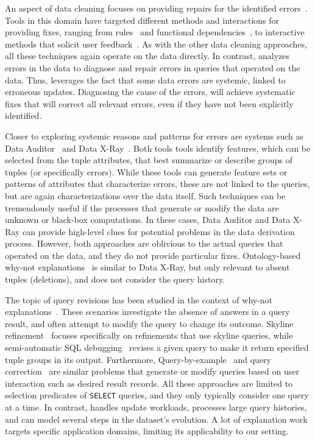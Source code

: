 An aspect of data cleaning focuses on providing repairs for the
identified errors~\cite{ChuIP13}. Tools in this domain have targeted
different methods and interactions for providing fixes, ranging from
rules~\cite{Beskales2010, Cong2007
} and functional
dependencies~\cite{Fan2008b, ChuIP13
}, to interactive methods that
solicit user feedback~\cite{Yakout, Raman01
}. As with the other data
cleaning approaches, all these techniques again operate on the data
directly. In contrast, \sys analyzes errors in the data to diagnose
and repair errors in queries that operated on the data. Thus, \sys
leverages the fact that some data errors are systemic, linked to
erroneous updates. Diagnosing the cause of the errors, will achieve
systematic fixes that will correct all relevant errors, even if they
have not been explicitly identified.

Closer to exploring systemic reasons and patterns for errors are systems such as
 Data Auditor~\cite{GolabKKS10, Golab2008
} and Data X-Ray~\cite{wang2015}. Both tools tools identify features, which can
be selected from the tuple attributes, that best summarize or describe
groups of tuples (or specifically errors). While these tools can
generate feature sets or patterns of attributes that characterize
errors, these are not linked to the queries, but are again
characterizations over the data itself. Such techniques can be
tremendously useful if the processes that generate or modify the data
are unknown or black-box computations. In these cases, Data Auditor
and Data X-Ray can provide high-level clues for potential problems in
the data derivation process. However, both approaches are oblivious to
the actual queries that operated on the data, and they do not provide
particular fixes. Ontology-based why-not
explanations~\cite{tenCate2015} is similar to Data X-Ray, but 
only relevant to absent tuples (deletions), and does not
consider the query history.

The topic of query revisions has been studied in the context of
why-not explanations~\cite{Chapman2009}. These scenarios investigate
the absence of answers in a query result, and often attempt to modify
the query to change its outcome. Skyline
refinement~\cite{tran2010conquer} focuses specifically on refinements
that use skyline queries, while semi-automatic SQL
debugging~\cite{tzompanaki14semi} revises a given query to make it
return specified tuple groups in its output.  Furthermore, Query-by-example~\cite{zloof1977query} 
and query correction~\cite{abouzied2012dataplay} are similar problems that generate or modify
queries based on user interaction such as desired result records.
All these approaches are
limited to selection predicates of \texttt{SELECT} queries, and they
only typically consider one query at a time. In contrast, \sys handles
update workloads, processes large query histories, and can model
several steps in the dataset's evolution. A lot of explanation work~\cite{GebalyAGKS14, Khoussainova2012, Thirumuruganathan2012, Das2011, Fabbri2011, Bender14} targets specific application domains, limiting its applicability to our setting.

